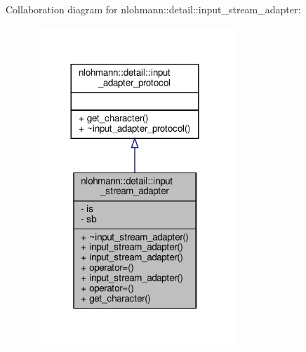 Collaboration diagram for nlohmann\+:\+:detail\+:\+:input\+\_\+stream\+\_\+adapter\+:\nopagebreak
\begin{figure}[H]
\begin{center}
\leavevmode
\includegraphics[width=216pt]{classnlohmann_1_1detail_1_1input__stream__adapter__coll__graph}
\end{center}
\end{figure}

